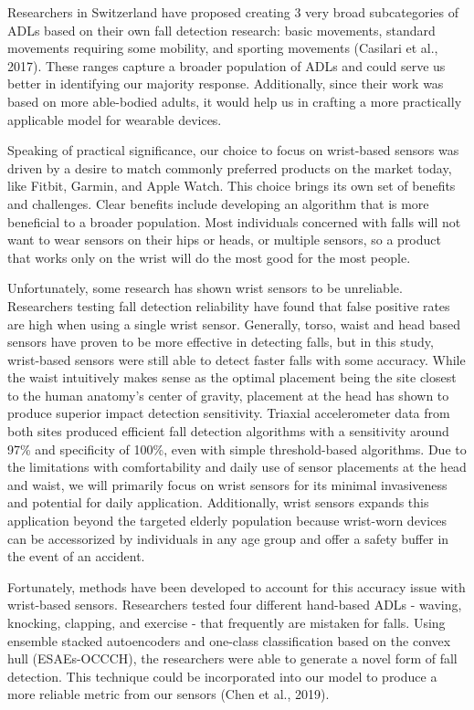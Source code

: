 \documentclass{llncs}
\begin{document}
	Researchers in Switzerland have proposed creating 3 very broad subcategories of ADLs based on their own fall detection research: basic movements, standard movements requiring some mobility, and sporting movements (Casilari et al., 2017).\cite{casilari2017analysis} These ranges capture a broader population of ADLs and could serve us better in identifying our majority response. Additionally, since their work was based on more able-bodied adults, it would help us in crafting a more practically applicable model for wearable devices.
	
	Speaking of practical significance, our choice to focus on wrist-based sensors was driven by a desire to match commonly preferred products on the market today, like Fitbit, Garmin, and Apple Watch. This choice brings its own set of benefits and challenges. Clear benefits include developing an algorithm that is more beneficial to a broader population. Most individuals concerned with falls will not want to wear sensors on their hips or heads, or multiple sensors, so a product that works only on the wrist will do the most good for the most people. 
	
	Unfortunately, some research has shown wrist sensors to be unreliable. Researchers testing fall detection reliability have found that false positive rates are high when using a single wrist sensor.\cite{gjoreski2016accurately} Generally, torso, waist and head based sensors have proven to be more effective in detecting falls, but in this study, wrist-based sensors were still able to detect faster falls with some accuracy. While the waist intuitively makes sense as the optimal placement being the site closest to the human anatomy's center of gravity, placement at the head has shown to produce superior impact detection sensitivity. Triaxial accelerometer data from both sites produced efficient fall detection algorithms with a sensitivity around 97\% and specificity of 100\%, even with simple threshold-based algorithms.\cite{kangas2008comparison} Due to the limitations with comfortability and daily use of sensor placements at the head and waist, we will primarily focus on wrist sensors for its minimal invasiveness and potential for daily application. Additionally, wrist sensors expands this application beyond the targeted elderly population because wrist-worn devices can be accessorized by individuals in any age group and offer a safety buffer in the event of an accident. 

	
	Fortunately, methods have been developed to account for this accuracy issue with wrist-based sensors. Researchers tested four different hand-based ADLs - waving, knocking, clapping, and exercise - that frequently are mistaken for falls. Using ensemble stacked autoencoders and one-class classification based on the convex hull (ESAEs-OCCCH), the researchers were able to generate a novel form of fall detection. This technique could be incorporated into our model to produce a more reliable metric from our sensors (Chen et al., 2019). \cite{chen2019method}
	
\end{document}
